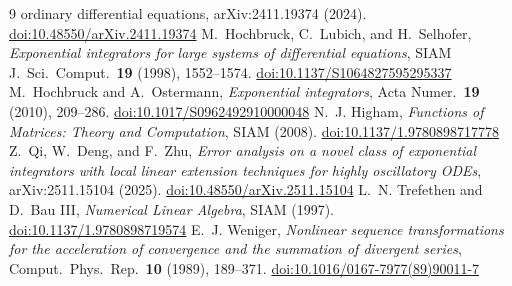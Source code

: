 \documentclass[11pt]{article}
\theoremstyle{plain}
\theoremstyle{definition}
\theoremstyle{remark}
\newcommand{\doi}[1]{\href{https://doi.org/#1}{doi:#1}}
\begin{document}
\begin{thebibliography}{9}
{ordinary differential equations}, arXiv:2411.19374 (2024).
\doi{10.48550/arXiv.2411.19374}
 M.~Hochbruck, C.~Lubich, and H.~Selhofer,
\emph{Exponential integrators for large systems of differential equations}, SIAM
J.\ Sci.\ Comput.\ \textbf{19} (1998), 1552--1574. \doi{10.1137/S1064827595295337}
 M.~Hochbruck and A.~Ostermann, \emph{Exponential
integrators}, Acta Numer.\ \textbf{19} (2010), 209--286.
\doi{10.1017/S0962492910000048}
 N.~J. Higham, \emph{Functions of Matrices: Theory and
Computation}, SIAM (2008). \doi{10.1137/1.9780898717778}
 Z.~Qi, W.~Deng, and F.~Zhu, \emph{Error analysis on a novel
class of exponential integrators with local linear extension techniques for
highly oscillatory ODEs}, arXiv:2511.15104 (2025).
\doi{10.48550/arXiv.2511.15104}
 L.~N. Trefethen and D.~Bau III, \emph{Numerical Linear
Algebra}, SIAM (1997). \doi{10.1137/1.9780898719574}
 E.~J. Weniger, \emph{Nonlinear sequence transformations for
the acceleration of convergence and the summation of divergent series}, Comput.\
Phys.\ Rep.\ \textbf{10} (1989), 189--371. \doi{10.1016/0167-7977(89)90011-7}
\end{thebibliography}
\end{document}
